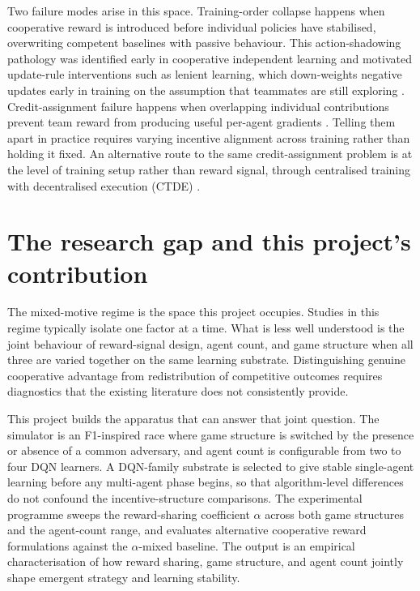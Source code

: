 Two failure modes arise in this space. Training-order collapse happens when cooperative reward is introduced before individual policies have stabilised, overwriting competent baselines with passive behaviour. This action-shadowing pathology was identified early in cooperative independent learning \citep{claus1998dynamics, matignon2012independent} and motivated update-rule interventions such as lenient learning, which down-weights negative updates early in training on the assumption that teammates are still exploring \citep{wei2016lenient}. Credit-assignment failure happens when overlapping individual contributions prevent team reward from producing useful per-agent gradients \citep{panait2005cooperative, rashid2018qmix}. Telling them apart in practice requires varying incentive alignment across training rather than holding it fixed. An alternative route to the same credit-assignment problem is at the level of training setup rather than reward signal, through centralised training with decentralised execution (CTDE) \citep{rashid2018qmix}.

\section{The research gap and this project's contribution}

The mixed-motive regime is the space this project occupies. Studies in this regime typically isolate one factor at a time. What is less well understood is the joint behaviour of reward-signal design, agent count, and game structure when all three are varied together on the same learning substrate. Distinguishing genuine cooperative advantage from redistribution of competitive outcomes requires diagnostics that the existing literature does not consistently provide.

This project builds the apparatus that can answer that joint question. The simulator is an F1-inspired race where game structure is switched by the presence or absence of a common adversary, and agent count is configurable from two to four DQN learners. A DQN-family substrate is selected to give stable single-agent learning before any multi-agent phase begins, so that algorithm-level differences do not confound the incentive-structure comparisons. The experimental programme sweeps the reward-sharing coefficient $\alpha$ across both game structures and the agent-count range, and evaluates alternative cooperative reward formulations against the $\alpha$-mixed baseline. The output is an empirical characterisation of how reward sharing, game structure, and agent count jointly shape emergent strategy and learning stability.

